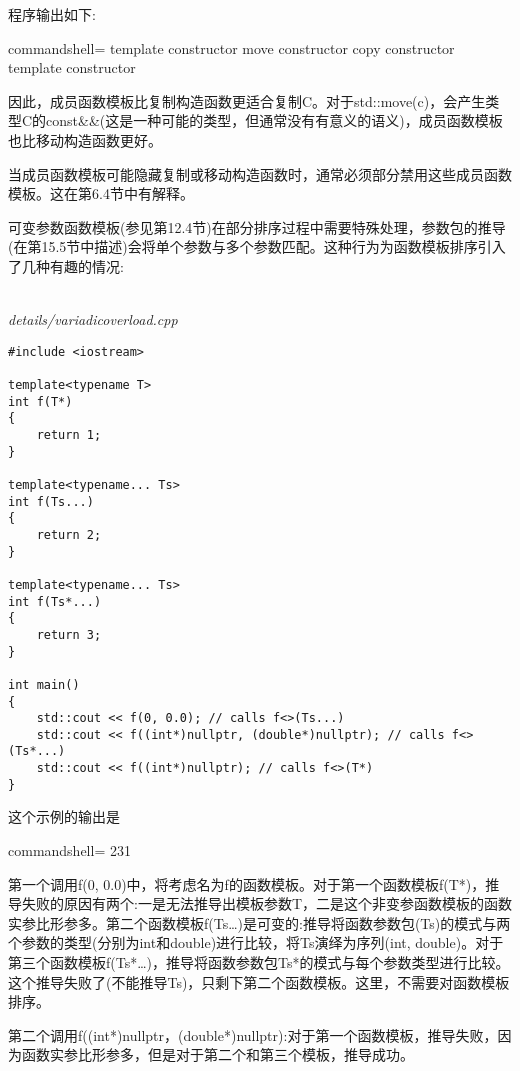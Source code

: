 程序输出如下:

\begin{tcblisting}{commandshell={}}
template constructor
move constructor
copy constructor
template constructor
\end{tcblisting}

因此，成员函数模板比复制构造函数更适合复制C。对于std::move(c)，会产生类型C的const\&\&(这是一种可能的类型，但通常没有有意义的语义)，成员函数模板也比移动构造函数更好。

当成员函数模板可能隐藏复制或移动构造函数时，通常必须部分禁用这些成员函数模板。这在第6.4节中有解释。



可变参数函数模板(参见第12.4节)在部分排序过程中需要特殊处理，参数包的推导(在第15.5节中描述)会将单个参数与多个参数匹配。这种行为为函数模板排序引入了几种有趣的情况:

\hspace*{\fill} \\ %
\noindent
\textit{details/variadicoverload.cpp}
\begin{lstlisting}[style=styleCXX]
#include <iostream>

template<typename T>
int f(T*)
{
	return 1;
}

template<typename... Ts>
int f(Ts...)
{
	return 2;
}

template<typename... Ts>
int f(Ts*...)
{
	return 3;
}

int main()
{
	std::cout << f(0, 0.0); // calls f<>(Ts...)
	std::cout << f((int*)nullptr, (double*)nullptr); // calls f<>(Ts*...)
	std::cout << f((int*)nullptr); // calls f<>(T*)
}
\end{lstlisting}

这个示例的输出是

\begin{tcblisting}{commandshell={}}
231
\end{tcblisting}

第一个调用f(0, 0.0)中，将考虑名为f的函数模板。对于第一个函数模板f(T*)，推导失败的原因有两个:一是无法推导出模板参数T，二是这个非变参函数模板的函数实参比形参多。第二个函数模板f(Ts…)是可变的:推导将函数参数包(Ts)的模式与两个参数的类型(分别为int和double)进行比较，将Ts演绎为序列(int, double)。对于第三个函数模板f(Ts*…)，推导将函数参数包Ts*的模式与每个参数类型进行比较。这个推导失败了(不能推导Ts)，只剩下第二个函数模板。这里，不需要对函数模板排序。

第二个调用f((int*)nullptr，(double*)nullptr):对于第一个函数模板，推导失败，因为函数实参比形参多，但是对于第二个和第三个模板，推导成功。

